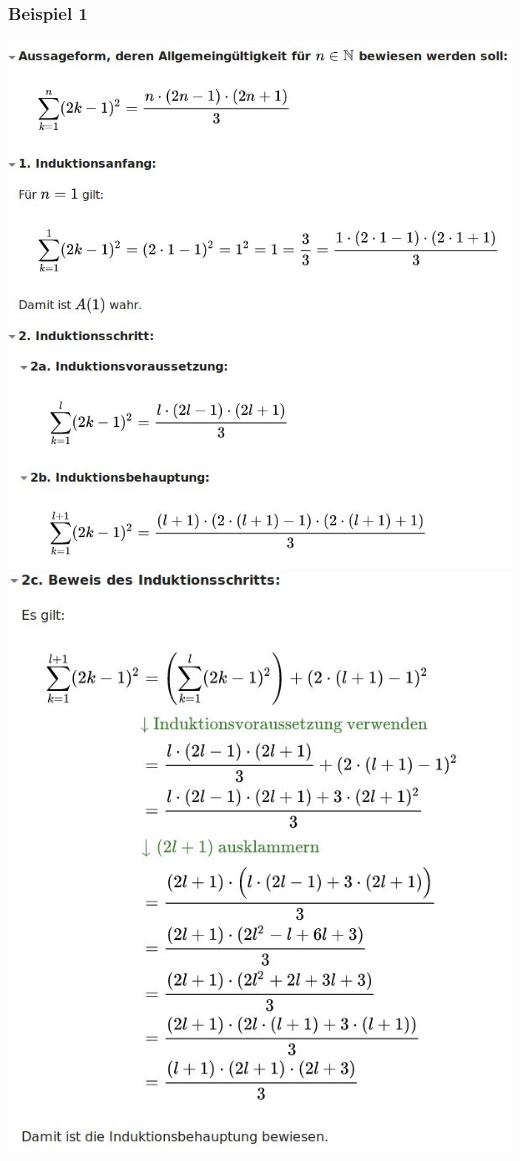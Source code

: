 \documentclass[14pt,a4paper]{article}
\begin{document}
\subsubsection{Beispiel 1}
\includegraphics[scale=0.6]{vorlagen/induktion3.jpg} \newpage
\includegraphics[scale=0.6]{vorlagen/induktion4.jpg} 
\end{document}
